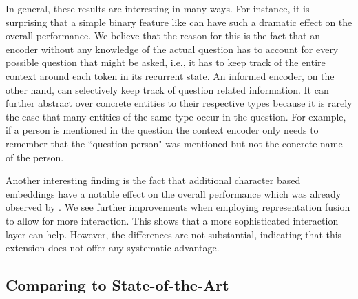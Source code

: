\documentclass[11pt,a4paper]{article}
\begin{document}
In general, these results are interesting in many ways. For instance, it is surprising that a simple binary feature like  can have such a dramatic effect on the overall performance. We believe that the reason for this is the fact that an encoder without any knowledge of the actual question has to account for every possible question that might be asked, i.e., it has to keep track of the entire context around each token in its recurrent state. An informed encoder, on the other hand, can selectively keep track of question related information. It can further abstract over concrete entities to their respective types because it is rarely the case that many entities of the same type occur in the question. For example, if a person is mentioned in the question the context encoder only needs to remember that the ``question-person" was mentioned but not the concrete name of the person.

Another interesting finding is the fact that additional character based embeddings have a notable effect on the overall performance which was already observed by . We see further improvements when employing representation fusion to allow for more interaction. This shows that a more sophisticated interaction layer can help. However, the differences are not substantial, indicating that this extension does not offer any systematic advantage.


\subsection{Comparing to State-of-the-Art}\label{sec:emp_results}
\end{document}
